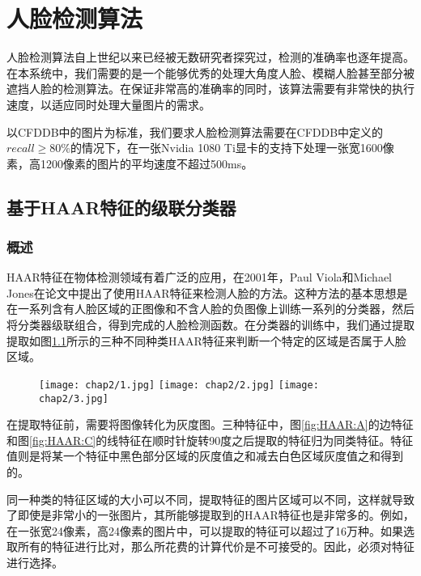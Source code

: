 \chapter{人脸检测算法}
\label{chap:facedetection}

人脸检测算法自上世纪以来已经被无数研究者探究过，检测的准确率也逐年提高。在本系统中，我们需要的是一个能够优秀的处理大角度人脸、模糊人脸甚至部分被遮挡人脸的检测算法。在保证非常高的准确率的同时，该算法需要有非常快的执行速度，以适应同时处理大量图片的需求。

以CFDDB中的图片为标准，我们要求人脸检测算法需要在CFDDB中定义的$recall\geq 80\%$的情况下，在一张Nvidia 1080 Ti显卡的支持下处理一张宽1600像素，高1200像素的图片的平均速度不超过500ms。


\section{基于HAAR特征的级联分类器}

\subsection{概述}
HAAR特征在物体检测领域有着广泛的应用，在2001年，Paul Viola和Michael Jones在论文\parencite{viola2004robust}中提出了使用HAAR特征来检测人脸的方法。这种方法的基本思想是在一系列含有人脸区域的正图像和不含人脸的负图像上训练一系列的分类器，然后将分类器级联组合，得到完成的人脸检测函数。在分类器的训练中，我们通过提取提取如图\ref{fig:HAAR}所示的三种不同种类HAAR特征来判断一个特定的区域是否属于人脸区域。

\begin{figure}[!htp]
	\centering
	{\texttt{[image: chap2/1.jpg]}}
	\hspace{4em}
	{\texttt{[image: chap2/2.jpg]}}
	\hspace{4em}
	{\texttt{[image: chap2/3.jpg]}}
	\label{fig:HAAR}
\end{figure}

在提取特征前，需要将图像转化为灰度图。三种特征中，图\ref{fig:HAAR:A}的边特征和图\ref{fig:HAAR:C}的线特征在顺时针旋转90度之后提取的特征归为同类特征。特征值则是将某一个特征中黑色部分区域的灰度值之和减去白色区域灰度值之和得到的。

同一种类的特征区域的大小可以不同，提取特征的图片区域可以不同，这样就导致了即使是非常小的一张图片，其所能够提取到的HAAR特征也是非常多的。例如，在一张宽24像素，高24像素的图片中，可以提取的特征可以超过了16万种。如果选取所有的特征进行比对，那么所花费的计算代价是不可接受的。因此，必须对特征进行选择。

